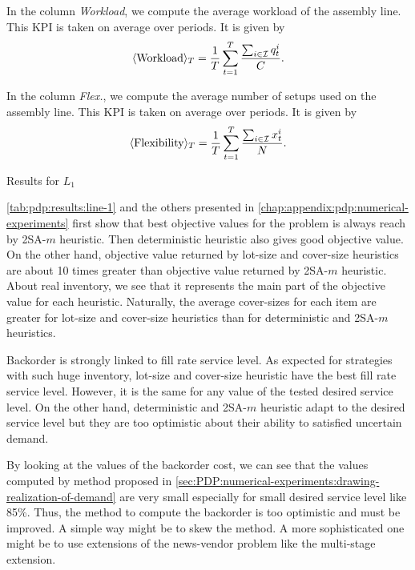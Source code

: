 In the column \emph{Workload}, we compute the average workload of the assembly line.
This KPI is taken on average over periods.
It is given by
\begin{equation}
  \left<\mbox{Workload}\right>_{\horizon} = \frac{1}{\horizon} \sum_{t=1}^{\horizon} \frac{\sum_{i\in\REF} \quantity_t^i}{\capacity}.
\end{equation}


In the column \emph{Flex.}, we compute the average number of setups used on the assembly line.
This KPI is taken on average over periods.
It is given by
\begin{equation}
  \left<\mbox{Flexibility}\right>_{\horizon} = \frac{1}{\horizon} \sum_{t=1}^{\horizon} \frac{\sum_{i\in\REF} \setup_t^i}{\nbsetups}.
\end{equation}


\begin{table}[!ht]

\caption{Results for $L_1$}
\label{tab:pdp:results:line-1}
\end{table}


\cref{tab:pdp:results:line-1} and the others presented in \cref{chap:appendix:pdp:numerical-experiments} first show that best objective values for the problem is always reach by 2SA-$m$ heuristic.
Then deterministic heuristic also gives good objective value.
On the other hand, objective value returned by lot-size and cover-size heuristics are about 10 times greater than objective value returned by 2SA-$m$ heuristic.
About real inventory, we see that it represents the main part of the objective value for each heuristic.
Naturally, the average cover-sizes for each item are greater for lot-size and cover-size heuristics than for deterministic and 2SA-$m$ heuristics.


Backorder is strongly linked to fill rate service level.
As expected for strategies with such huge inventory, lot-size and cover-size heuristic have the best fill rate service level.
However, it is the same for any value of the tested desired service level.
On the other hand, deterministic and 2SA-$m$ heuristic adapt to the desired service level but they are too optimistic about their ability to satisfied uncertain demand.


By looking at the values of the backorder cost, we can see that the values computed by method proposed in \cref{sec:PDP:numerical-experiments:drawing-realization-of-demand} are very small especially for small desired service level like 85\%.
Thus, the method to compute the backorder is too optimistic and must be improved.
A simple way might be to skew the method.
A more sophisticated one might be to use extensions of the news-vendor problem like the multi-stage extension.


